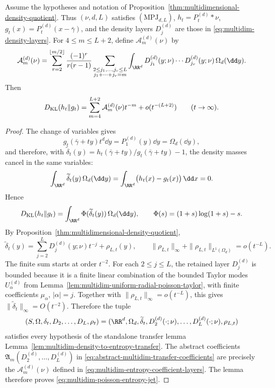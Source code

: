 \begin{theorem}%
\label{thm:multidimensional-poisson-entropy-jets}
Assume the hypotheses and notation of
Proposition~\ref{thm:multidimensional-density-quotient}.  Thus
\((\nu,d,L)\) satisfies \((\mathrm{MPJ}_{d,L})\), \(h_t=P_t^{(d)}*\nu\),
\(g_t(x)=P_t^{(d)}(x-\bar{\gamma})\), and the density layers
\(D_j^{(d)}\) are those in \eqref{eq:multidim-density-layers}.  For
\(4\le m\le L+2\), define \(\mathcal A_m^{(d)}(\nu)\) by
\begin{equation}\label{eq:multidim-entropy-coefficient-layers}
\mathcal A_m^{(d)}(\nu)=
\sum_{r=2}^{\lfloor m/2\rfloor}
\frac{(-1)^r}{r(r-1)}
\sum_{\substack{2\le j_1,\ldots,j_r\le L\\
j_1+\cdots+j_r=m}}
\int_{\RR^d}D_{j_1}^{(d)}(y;\nu)\cdots
D_{j_r}^{(d)}(y;\nu)\,\Omega_d(\dd y).
\end{equation}
Then
\begin{equation}\label{eq:multidim-poisson-entropy-jet}
D_{\rm KL}(h_t\|g_t)
=\sum_{m=4}^{L+2}\mathcal A_m^{(d)}(\nu)t^{-m}
+o(t^{-(L+2)})
\qquad(t\to\infty).
\end{equation}
\end{theorem}

\begin{proof}
The change of variables gives
\[
g_t(\bar{\gamma}+ty)t^d\dd y=P_1^{(d)}(y)\dd y=\Omega_d(\dd y),
\]
and therefore, with
\(\widetilde\delta_t(y)=h_t(\bar{\gamma}+ty)/g_t(\bar{\gamma}+ty)-1\),
the density masses cancel in the same variables:
\[
\int_{\RR^d}\widetilde\delta_t(y)\,\Omega_d(\dd y)
=\int_{\RR^d}\bigl(h_t(x)-g_t(x)\bigr)\,\dd x=0.
\]
Hence
\[
D_{\rm KL}(h_t\|g_t)
=\int_{\RR^d}\Phi(\widetilde\delta_t(y))\,\Omega_d(\dd y),
\qquad
\Phi(s)=(1+s)\log(1+s)-s.
\]
By Proposition~\ref{thm:multidimensional-density-quotient},
\[
\widetilde\delta_t(y)
=\sum_{j=2}^{L}D_j^{(d)}(y;\nu)t^{-j}
+\rho_{L,t}(y),
\qquad
\|\rho_{L,t}\|_\infty+\|\rho_{L,t}\|_{L^1(\Omega_d)}=o(t^{-L}).
\]
The finite sum starts at order \(t^{-2}\).  For each \(2\le j\le L\), the
retained layer \(D_j^{(d)}\) is bounded because it is a finite linear
combination of the bounded Taylor modes \(U_\alpha^{(d)}\) from
Lemma~\ref{lem:multidim-uniform-radial-poisson-taylor}, with finite
coefficients \(\mu_\alpha\), \(|\alpha|=j\).  Together with
\(\|\rho_{L,t}\|_\infty=o(t^{-L})\), this gives
\(\|\widetilde\delta_t\|_\infty=O(t^{-2})\).  Therefore the tuple
\[
(S,\Omega,\delta_t,D_2,\ldots,D_L,\rho_t)
=
(\RR^d,\Omega_d,\widetilde\delta_t,
D_2^{(d)}(\cdot;\nu),\ldots,D_L^{(d)}(\cdot;\nu),\rho_{L,t})
\]
satisfies every hypothesis of the standalone transfer lemma
Lemma~\ref{lem:multidim-density-to-entropy-transfer}.  The abstract
coefficients
\(\mathfrak A_m(D_2^{(d)},\ldots,D_L^{(d)})\) in
\eqref{eq:abstract-multidim-transfer-coefficients} are precisely the
\(\mathcal A_m^{(d)}(\nu)\) defined in
\eqref{eq:multidim-entropy-coefficient-layers}.  The lemma therefore proves
\eqref{eq:multidim-poisson-entropy-jet}.
\end{proof}

